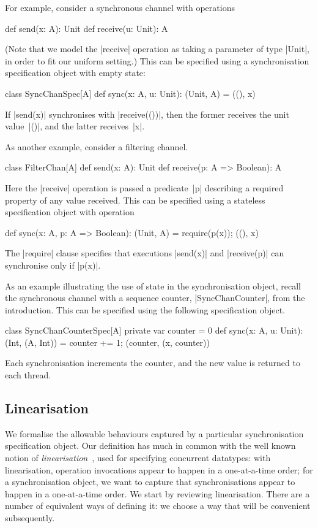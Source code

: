 For example, consider a synchronous channel with operations
\begin{scala}
def send(x: A): Unit
def receive(u: Unit): A
\end{scala}
%
(Note that we model the |receive| operation as taking a parameter of type
|Unit|, in order to fit our uniform setting.) 
%
This can be specified using a synchronisation specification object
with empty state:
%
\begin{scala}
class SyncChanSpec[A]{
  def sync(x: A, u: Unit): (Unit, A) = ((), x)
}
\end{scala}
%
If |send(x)| synchronises with |receive(())|, then the former receives the
unit value~|()|, and the latter receives~|x|. 

As another example, consider a filtering channel.
\begin{scala}
class FilterChan[A]{
  def send(x: A): Unit
  def receive(p: A => Boolean): A
}
\end{scala}
%
Here the |receive| operation is passed a predicate~|p| describing a required
property of any value received.  This can be specified using a stateless
specification object with operation
%
\begin{scala}
def sync(x: A, p: A => Boolean): (Unit, A) = { require(p(x)); ((), x) }
\end{scala}
%
The |require| clause specifies that executions |send(x)| and |receive(p)| can
synchronise only if |p(x)|.

As an example illustrating the use of state in the synchronisation object,
recall the synchronous channel with a sequence counter, |SyncChanCounter|,
from the introduction.  This can be specified using the following
specification object.
%
\begin{scala}
class SyncChanCounterSpec[A]{
  private var counter = 0
  def sync(x: A, u: Unit): (Int, (A, Int)) = {
    counter += 1; (counter, (x, counter))
  }
}
\end{scala}
%
Each synchronisation increments the counter, and the new value is returned to
each thread.


\subsection{Linearisation}
\label{sec:specification-linearisability}

We formalise the allowable behaviours captured by a particular synchronisation
specification object.  Our definition has much in common with the well known
notion of \emph{linearisation}~\cite{herlihy-wing}, used for specifying
concurrent datatypes: with linearisation, operation invocations appear to
happen in a one-at-a-time order; for a synchronisation object, we want to
capture that synchronisations appear to happen in a one-at-a-time order.  We
start by reviewing linearisation.  There are a number of equivalent ways of
defining it: we choose a way that will be convenient subsequently.

